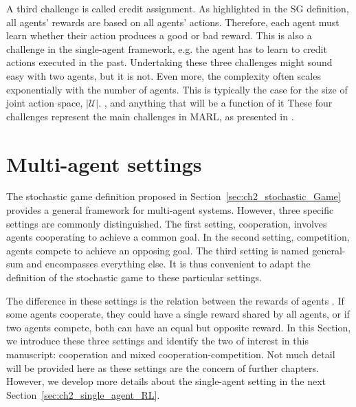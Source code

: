 A third challenge is called credit assignment.
As highlighted in the SG definition, all agents' rewards are based on all agents' actions.
Therefore, each agent must learn whether their action produces a good or bad reward.
This is also a challenge in the single-agent framework, e.g. the agent has to learn to credit actions executed in the past.
Undertaking these three challenges might sound easy with two agents, but it is not.
Even more, the complexity often scales exponentially with the number of agents.
This is typically the case for the size of joint action space, $|\mathcal{U}|$.
, and anything that will be a function of it
These four challenges represent the main challenges in MARL, as presented in \citep{marl-book}.



\section{Multi-agent settings} 
\label{sec:ch2_multi_agent_settings}
The stochastic game definition proposed in Section~\ref{sec:ch2_stochastic_Game} provides a general framework for multi-agent systems.
However, three specific settings are commonly distinguished.
The first setting, cooperation, involves agents cooperating to achieve a common goal.
In the second setting, competition, agents compete to achieve an opposing goal.
The third setting is named general-sum and encompasses everything else.
It is thus convenient to adapt the definition of the stochastic game to these particular settings.

The difference in these settings is the relation between the rewards of agents \citep{marl-book}.
If some agents cooperate, they could have a single reward shared by all agents, or if two agents compete, both can have an equal but opposite reward.
In this Section, we introduce these three settings and identify the two of interest in this manuscript: cooperation and mixed cooperation-competition.
Not much detail will be provided here as these settings are the concern of further chapters.
However, we develop more details about the single-agent setting in the next Section~\ref{sec:ch2_single_agent_RL}.



